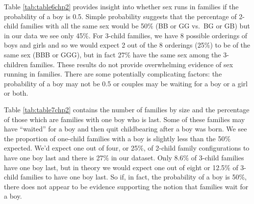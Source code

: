 \documentclass[
]{krantz}
\begin{document}
Table \ref{tab:table6chp2} provides insight into whether sex runs in families if the probability of a boy is 0.5. Simple probability suggests that the percentage of 2-child families with all the same sex would be 50\% (BB or GG vs.~BG or GB) but in our data we see only 45\%. For 3-child families, we have 8 possible orderings of boys and girls and so we would expect 2 out of the 8 orderings (25\%) to be of the same sex (BBB or GGG), but in fact 27\% have the same sex among the 3-children families. These results do not provide overwhelming evidence of sex running in families. There are some potentially complicating factors: the probability of a boy may not be 0.5 or couples may be waiting for a boy or a girl or both.

\begin{table}

\caption{\label{tab:table6chp2}Proportion of families in NLSY data with all the same sex by number of children in the family. Note that 1-child families are all homogeneous with respect to sex, so we look at 2- and 3-child families.}
\centering
{}
\end{table}

Table \ref{tab:table7chp2} contains the number of families by size and the percentage of those which are families with one boy who is last. Some of these families may have ``waited'' for a boy and then quit childbearing after a boy was born. We see the proportion of one-child families with a boy is slightly less than the 50\% expected. We'd expect one out of four, or 25\%, of 2-child family configurations to have one boy last and there is 27\% in our dataset. Only 8.6\% of 3-child families have one boy last, but in theory we would expect one out of eight or 12.5\% of 3-child families to have one boy last. So if, in fact, the probability of a boy is 50\%, there does not appear to be evidence supporting the notion that families wait for a boy.

\begin{table}

\caption{\label{tab:table7chp2}Proportion of families in NLSY data with only one boy who is born last.}
\centering
{}
\end{table}
\end{document}
